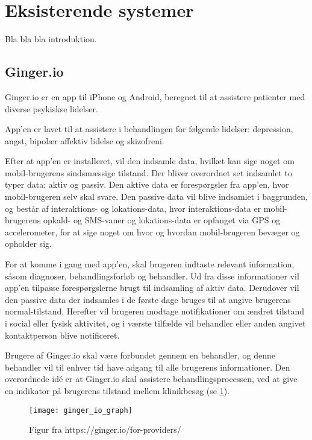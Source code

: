 \section{Eksisterende systemer}
Bla bla bla introduktion.

\subsection{Ginger.io}
Ginger.io er en app til iPhone og Android, beregnet til at assistere patienter med diverse psykiskse lidelser.\cite{ginger_dot_io}\cite{gingerio_mit}\cite{gingerio_dailymail}


App'en er lavet til at assistere i behandlingen for følgende lidelser: depression, angst, bipolær affektiv lidelse og skizofreni.

Efter at app'en er installeret, vil den indsamle data, hvilket kan sige noget om mobil-brugerens sindsmæssige tilstand.
Der bliver overordnet set indsamlet to typer data; aktiv og passiv.
Den aktive data er forespørgsler fra app'en, hvor mobil-brugeren selv skal svare.
Den passive data vil blive indsamlet i baggrunden, og består af interaktions- og lokations-data, hvor interaktions-data er mobil-brugerens opkald- og SMS-vaner og lokations-data er opfanget via GPS og accelerometer, for at sige noget om hvor og hvordan mobil-brugeren bevæger og opholder sig.

For at komme i gang med app'en, skal brugeren indtaste relevant information, såsom diagnoser, behandlingsforløb og behandler.
Ud fra disse informationer vil app'en tilpasse forespørgslerne brugt til indsamling af aktiv data.
Derudover vil den passive data der indsamles i de første dage bruges til at angive brugerens normal-tilstand.
Herefter vil brugeren modtage notifikationer om ændret tilstand i social eller fysisk aktivitet, og i værste tilfælde vil behandler eller anden angivet kontaktperson blive notificeret.

Brugere af Ginger.io skal være forbundet gennem en behandler, og denne behandler vil til enhver tid have adgang til alle brugerens informationer.
Den overordnede idé er at Ginger.io skal assistere behandlingsprocessen, ved at give en indikator på brugerens tilstand mellem klinikbesøg (se \cref{eksisterende_systemer:ginger_io_graf}).

\begin{figure}[h]
\centering
\texttt{[image: ginger\_io\_graph]}
\caption{Figur fra https://ginger.io/for-providers/}
\label{eksisterende_systemer:ginger_io_graf}
\end{figure}

